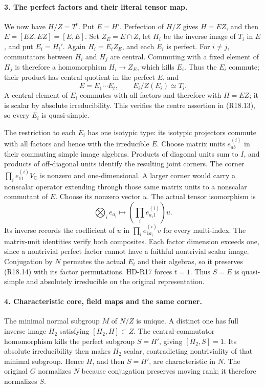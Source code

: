 \paragraph{3. The perfect factors and their literal tensor map.}
We now have \(H/Z=T^t\). Put \(E=H'\). Perfection of
\(H/Z\) gives \(H=EZ\), and then
\(E=[EZ,EZ]=[E,E]\). Set \(Z_E=E\cap Z\), let
\(H_i\) be the inverse image of \(T_i\) in \(E\),
and put \(E_i=H_i'\). Again \(H_i=E_iZ_E\), and each
\(E_i\) is perfect. For \(i\ne j\), commutators between
\(H_i\) and \(H_j\) are central. Commuting with a fixed
element of \(H_j\) is therefore a homomorphism
\(H_i\to Z_E\), which kills \(E_i\). Thus the \(E_i\)
commute; their product has central quotient in the perfect
\(E\), and
\[
        E=E_1\cdots E_t,\qquad
        E_i/Z(E_i)\simeq T_i.                           \tag{R18.13}
\]
A central element of \(E_i\) commutes with all factors
and therefore with \(H=EZ\); it is scalar by absolute
irreducibility. This verifies the centre assertion in
(R18.13), so every \(E_i\) is quasi-simple.

The restriction to each \(E_i\) has one isotypic type:
its isotypic projectors commute with all factors and hence
with the irreducible \(E\). Choose matrix units
\(e^{(i)}_{ab}\) in their commuting simple image algebras.
Products of diagonal units sum to \(I\), and products of
off-diagonal units identify the resulting joint corners.
The corner \(\prod_i e^{(i)}_{11}V_{\mathbb C}\) is
nonzero and one-dimensional. A larger corner would carry
a nonscalar operator extending through those same matrix
units to a nonscalar commutant of \(E\). Choose its
nonzero vector \(u\). The actual tensor isomorphism is
\[
 \bigotimes_i e_{a_i}\longmapsto
            \left(\prod_i e^{(i)}_{a_i1}\right)u.         \tag{R18.14}
\]
Its inverse records the coefficient of \(u\) in
\(\prod_i e^{(i)}_{1a_i}v\) for every multi-index.
The matrix-unit identities verify both composites.
Each factor dimension exceeds one, since a nontrivial
perfect factor cannot have a faithful nontrivial scalar
image. Conjugation by \(N\) permutes the actual \(E_i\)
and their algebras, so it preserves (R18.14) with its
factor permutations. HD-R17 forces \(t=1\).
Thus \(S=E\) is quasi-simple and absolutely irreducible
on the original representation.

\paragraph{4. Characteristic core, field maps and the same corner.}
The minimal normal subgroup \(M\) of \(N/Z\) is unique.
A distinct one has full inverse image \(H_2\) satisfying
\([H_2,H]\subset Z\). The central-commutator homomorphism
kills the perfect subgroup \(S=H'\), giving
\([H_2,S]=1\). Its absolute irreducibility then makes
\(H_2\) scalar, contradicting nontriviality of that
minimal subgroup. Hence \(H\), and then \(S=H'\), are
characteristic in \(N\). The original \(G\) normalizes
\(N\) because conjugation preserves moving rank; it
therefore normalizes \(S\).

